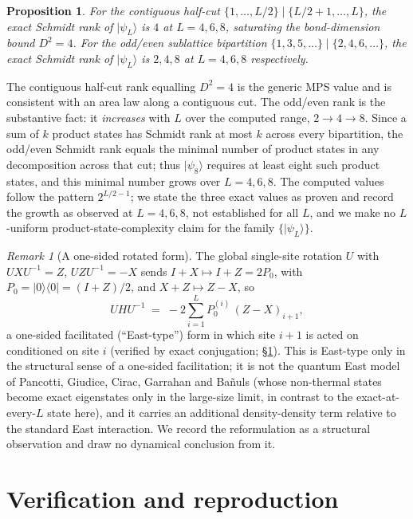 \documentclass[11pt]{amsart}
\newcommand{\ket}[1]{\lvert #1 \rangle}
\newcommand{\bra}[1]{\langle #1 \rvert}
\newcommand{\psiL}{\ket{\psi_L}}
\theoremstyle{plain}
\newtheorem{proposition}[theorem]{Proposition}
\theoremstyle{definition}
\theoremstyle{remark}
\newtheorem{remark}[theorem]{Remark}
\begin{document}
\begin{proposition}\label{prop:schmidt}
For the contiguous half-cut $\{1,\dots,L/2\}\mid\{L/2+1,\dots,L\}$, the exact
Schmidt rank of $\psiL$ is $4$ at $L=4,6,8$, saturating the bond-dimension
bound $D^2=4$. For the odd/even sublattice bipartition
$\{1,3,5,\dots\}\mid\{2,4,6,\dots\}$, the exact Schmidt rank of $\psiL$ is
$2,4,8$ at $L=4,6,8$ respectively.
\end{proposition}

The contiguous half-cut rank equalling $D^2=4$ is the generic MPS value and
is consistent with an area law along a contiguous cut. The odd/even rank is
the substantive fact: it \emph{increases} with $L$ over the computed range,
$2\to4\to8$. Since a sum of $k$ product states has Schmidt rank at most $k$
across every bipartition, the odd/even Schmidt rank equals the minimal number
of product states in any decomposition across that cut; thus $\ket{\psi_8}$
requires at least eight such product states, and this minimal number grows
over $L=4,6,8$. The computed values follow the pattern $2^{L/2-1}$; we state
the three exact values as proven and record the growth as observed at
$L=4,6,8$, not established for all $L$, and we make no $L$-uniform
product-state-complexity claim for the family $\{\psiL\}$.

\begin{remark}[A one-sided rotated form]\label{rem:east}
The global single-site rotation $U$ with $UXU^{-1}=Z$, $UZU^{-1}=-X$ sends
$I+X\mapsto I+Z=2P_0$, with $P_0=\ket0\!\bra0=(I+Z)/2$, and
$X+Z\mapsto Z-X$, so
\[
U H U^{-1} \;=\; -2\sum_{i=1}^{L} P_0^{(i)}\,(Z-X)_{i+1},
\]
a one-sided facilitated (``East-type'') form in which site $i+1$ is acted on
conditioned on site $i$ (verified by exact conjugation; \S\ref{sec:verif}).
This is East-type only in the structural sense of a one-sided facilitation;
it is not the quantum East model of Pancotti, Giudice, Cirac, Garrahan and
Ba\~nuls \cite{PGCGB20} (whose non-thermal states become exact eigenstates
only in the large-size limit, in contrast to the exact-at-every-$L$ state
here), and it carries an additional density-density term relative to the
standard East interaction. We record the reformulation as a structural
observation and draw no dynamical conclusion from it.
\end{remark}

\section{Verification and reproduction}\label{sec:verif}
\end{document}
